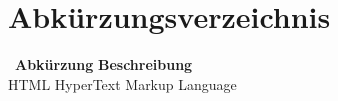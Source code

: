 
\chapter*{Abkürzungsverzeichnis}\thispagestyle{fancy}

\begin{tabbing}
\ \= \textbf{Abkürzung} \hspace{0.5cm} \= \textbf{Beschreibung} \kill
\\
\> HTML \>  HyperText Markup Language \\

\end{tabbing}
